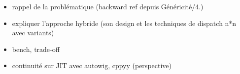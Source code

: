 \begin{itemize}
  \item rappel de la problématique (backward ref depuis Généricité/4.)
  \item expliquer l'approche hybride (son design et les techniques de dispatch n*n avec variants)
  \item bench, trade-off
  \item continuité sur JIT avec autowig, cppyy (perspective)
\end{itemize}